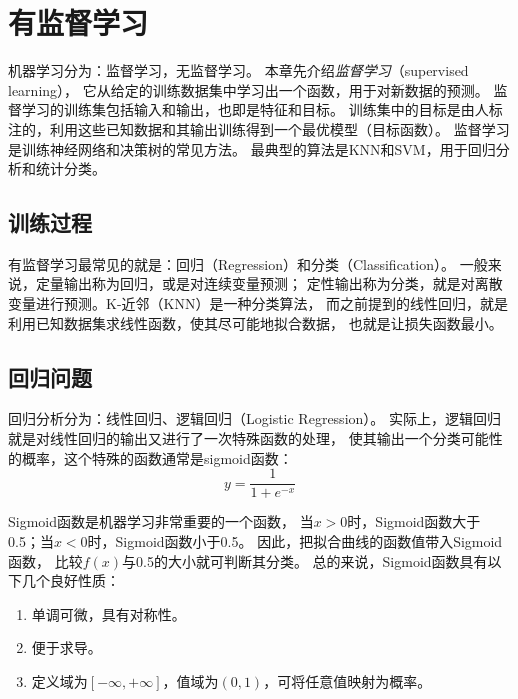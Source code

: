\chapter{有监督学习}
\label{chap:supervised}
机器学习分为：监督学习，无监督学习。
本章先介绍\emph{监督学习}（supervised learning），
它从给定的训练数据集中学习出一个函数，用于对新数据的预测。
监督学习的训练集包括输入和输出，也即是特征和目标。
训练集中的目标是由人标注的，利用这些已知数据和其输出训练得到一个最优模型（目标函数）。
监督学习是训练神经网络和决策树的常见方法。
最典型的算法是KNN和SVM，用于回归分析和统计分类。

\section{训练过程}
有监督学习最常见的就是：回归（Regression）和分类（Classification）。
一般来说，定量输出称为回归，或是对连续变量预测；
定性输出称为分类，就是对离散变量进行预测。K-近邻（KNN）是一种分类算法，
而之前提到的线性回归，就是利用已知数据集求线性函数，使其尽可能地拟合数据，
也就是让损失函数最小。

\section{回归问题}
回归分析分为：线性回归、逻辑回归（Logistic Regression）。
实际上，逻辑回归就是对线性回归的输出又进行了一次特殊函数的处理，
使其输出一个分类可能性的概率，这个特殊的函数通常是sigmoid函数：
$$ y = \frac{1}{1+e^{-x}} $$
\begin{figure}[!htbp]
\centering
{}
\end{figure}

Sigmoid函数是机器学习非常重要的一个函数，
当$x>0$时，Sigmoid函数大于0.5；当$x<0$时，Sigmoid函数小于0.5。
因此，把拟合曲线的函数值带入Sigmoid函数，
比较$f(x)$与0.5的大小就可判断其分类。
总的来说，Sigmoid函数具有以下几个良好性质：
\begin{enumerate}
	\item 单调可微，具有对称性。
	\item 便于求导。
	\item 定义域为$[-\infty, +\infty]$，值域为$(0, 1)$，可将任意值映射为概率。
\end{enumerate}

